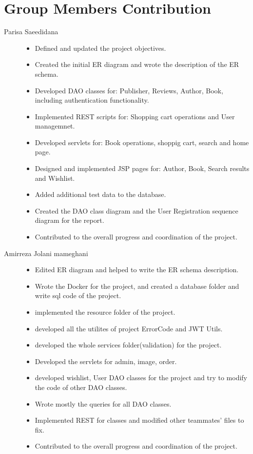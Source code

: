 \section{Group Members Contribution}


\begin{description}
	\item[Parisa Saeedidana] \hfill
	    \begin{itemize}
		\item Defined and updated the project objectives.
		\item Created the initial ER diagram and wrote the description of the ER schema.
		\item Developed DAO classes for: Publisher, Reviews, Author, Book, including authentication functionality.
		\item Implemented REST scripts for: Shopping cart operations and User managemnet.
		\item Developed servlets for: Book operations, shoppig cart, search and home page.
		\item Designed and implemented JSP pages for: Author, Book, Search results and Wishlist.
		\item Added additional test data to the database.
		\item Created the DAO class diagram and the User Registration sequence diagram for the report.
		\item Contributed to the overall progress and coordination of the project.
		\end{itemize}

	\item[Amirreza Jolani mameghani] \hfill    
	\begin{itemize}
		\item Edited ER diagram and helped to write the ER schema description.
		\item Wrote the Docker for the project, and created a database folder and write sql code of the project.
		\item implemented the resource folder of the project.
		\item developed all the utilites of project ErrorCode and JWT Utils.
		\item developed the whole services folder(validation) for the project.
		\item Developed the servlets for admin, image, order.
		\item developed wishlist, User DAO classes for the project and try to modify the code of other DAO classes.
		\item Wrote mostly the queries for all DAO classes.
		\item Implemented REST for classes and modified other teammates' files to fix.
		\item Contributed to the overall progress and coordination of the project.
	\end{itemize}


\end{description}
